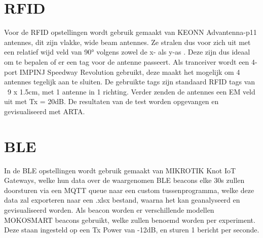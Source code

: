 \section{RFID}
Voor de RFID opstellingen wordt gebruik gemaakt van KEONN Advantenna-p11 antennes, dit zijn vlakke, wide beam antennes. Ze stralen dus voor zich uit met een relatief wijd veld van 90° volgens zowel de x- als y-as \autocite{Keonn}. Deze zijn dus ideaal om te bepalen of er een tag voor de antenne passeert.
Als tranceiver wordt een 4-port IMPINJ Speedway Revolution gebruikt, deze maakt het mogelijk om 4 antennes tegelijk aan te sluiten. De gebruikte tags zijn standaard RFID tags van ~9 x 1.5cm, met 1 antenne in 1 richting. Verder zenden de antennes een EM veld uit met Tx = 20dB. De resultaten van de test worden opgevangen en gevisualiseerd met ARTA.

\section{BLE}
In de BLE opstellingen wordt gebruik gemaakt van MIKROTIK Knot IoT Gateways, welke hun data over de waargenomen BLE beacons elke 30s zullen doorsturen via een MQTT queue naar een custom tussenprogramma, welke deze data zal exporteren naar een .xlsx bestand, waarna het kan geanalyseerd en gevisualiseerd worden. Als beacon worden er verschillende modellen MOKOSMART beacons gebruikt, welke zullen benoemd worden per experiment. Deze staan ingesteld op een Tx Power van -12dB, en sturen 1 bericht per seconde.





